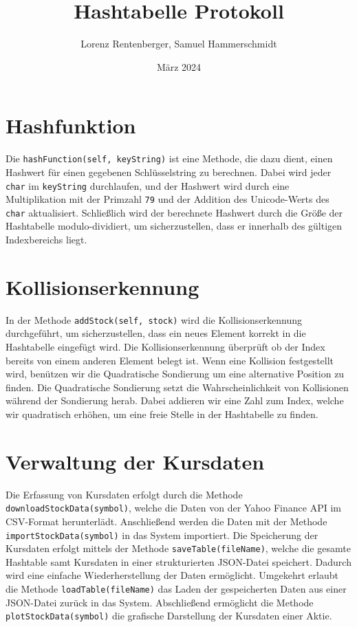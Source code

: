 \documentclass{article}
\title{Hashtabelle Protokoll}
\author{Lorenz Rentenberger, Samuel Hammerschmidt}
\date{März 2024}
\begin{document}
\maketitle

\section*{Hashfunktion}

Die \texttt{hashFunction(self, keyString)} ist eine Methode, die dazu dient, einen Hashwert für einen gegebenen Schlüsselstring zu berechnen. 
Dabei wird jeder \texttt{char} im \texttt{keyString} durchlaufen, und der Hashwert wird durch eine Multiplikation mit der Primzahl \texttt{79} und der Addition des Unicode-Werts 
des \texttt{char} aktualisiert. Schließlich wird der berechnete Hashwert durch die Größe der Hashtabelle modulo-dividiert, um sicherzustellen, dass er innerhalb 
des gültigen Indexbereichs liegt.

\section*{Kollisionserkennung}
In der Methode \texttt{addStock(self, stock)} wird die Kollisionserkennung durchgeführt, um sicherzustellen, dass ein neues Element korrekt in die Hashtabelle eingefügt wird.
Die Kollisionserkennung überprüft ob der Index bereits von einem anderen Element belegt ist. 
Wenn eine Kollision festgestellt wird, benützen wir die Quadratische Sondierung um eine alternative Position zu finden. Die Quadratische Sondierung 
setzt die Wahrscheinlichkeit von Kollisionen während der Sondierung herab. Dabei addieren wir eine Zahl zum Index, welche wir quadratisch erhöhen, 
um eine freie Stelle in der Hashtabelle zu finden. 

\section*{Verwaltung der Kursdaten}
Die Erfassung von Kursdaten erfolgt durch die Methode \texttt{downloadStockData(symbol)}, welche die Daten von der Yahoo Finance API im CSV-Format herunterlädt. 
Anschließend werden die Daten mit der Methode \texttt{importStockData(symbol)} in das System importiert. Die Speicherung der Kursdaten erfolgt mittels der Methode 
\texttt{saveTable(fileName)}, welche die gesamte Hashtable samt Kursdaten in einer strukturierten JSON-Datei speichert. Dadurch wird eine einfache Wiederherstellung 
der Daten ermöglicht. Umgekehrt erlaubt die Methode \texttt{loadTable(fileName)} das Laden der gespeicherten Daten aus einer JSON-Datei zurück in das System. Abschließend 
ermöglicht die Methode \texttt{plotStockData(symbol)} die grafische Darstellung der Kursdaten einer Aktie.
\end{document}
